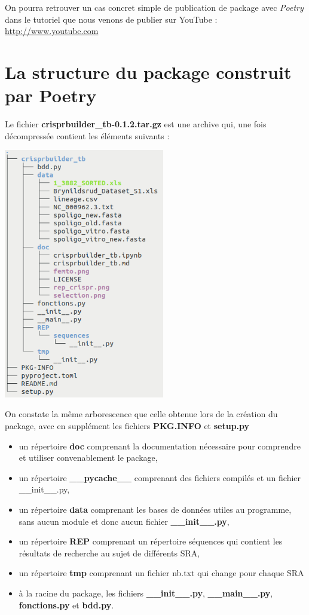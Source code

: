 \documentclass[twoside,a4paper,11pt,frenchb,openany]{report}
\begin{document}
On pourra retrouver un cas concret simple de publication de package avec \textit{Poetry} dans le tutoriel que nous venons de publier sur YouTube : \href{http://www.youtube.com}{http://www.youtube.com}





\section{La structure du package construit par Poetry}

Le fichier \textbf{crisprbuilder\_tb-0.1.2.tar.gz} est une archive qui, une fois décompressée contient les éléments suivants :

\includegraphics[width=7cm]{tar.png}

On constate la même arborescence que celle obtenue lors de la création du package, avec en supplément les fichiers \textbf{PKG.INFO} et \textbf{setup.py}

\begin{itemize}
\item un répertoire \textbf{doc} comprenant la documentation nécessaire pour comprendre et utiliser convenablement le package,
\item un répertoire \textbf{\_\_pycache\_\_} comprenant des fichiers compilés et un fichier \_\_init\_\_.py,
\item un répertoire \textbf{data} comprenant les bases de données utiles au programme, sans aucun module et donc aucun fichier \textbf{\_\_init\_\_.py},
\item un répertoire \textbf{REP} comprenant un répertoire séquences qui contient les résultats de recherche au sujet de différents SRA,
\item un répertoire \textbf{tmp} comprenant un fichier nb.txt qui change pour chaque SRA
\item à la racine du package, les fichiers \textbf{\_\_init\_\_.py}, \textbf{\_\_main\_\_.py}, \textbf{fonctions.py} et \textbf{bdd.py}.
\end{itemize}
\end{document}
